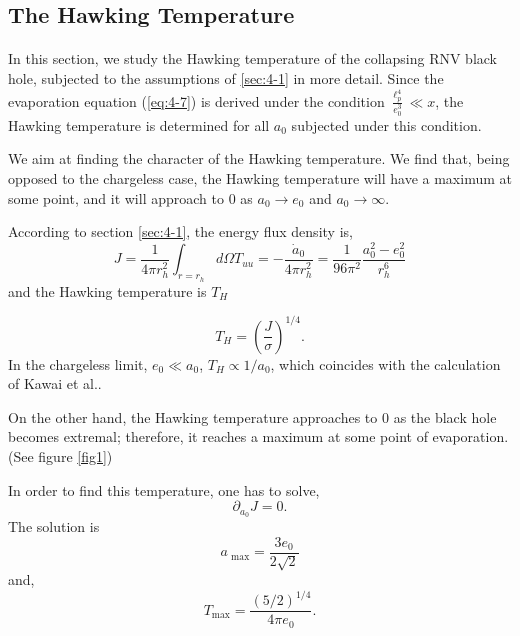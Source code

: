 \documentclass[letterpaper,12pt]{article}
\begin{document}
\subsection{The Hawking Temperature}\label{sec:4-3}
\paragraph{ }
In this section, we study the Hawking temperature of the collapsing RNV black hole, subjected to the assumptions of \ref{sec:4-1} in more detail. Since the evaporation equation (\ref{eq:4-7}) is derived under the condition  $\frac{\ell_{p}^{4}}{e_{0}^{3}} \ll x$, the Hawking temperature is determined for all $a_{0}$ subjected under this condition.

We aim at finding the character of the Hawking temperature. We find that, being opposed to the chargeless case, the Hawking temperature will have a maximum at some point, and it will approach to 0 as $a_{0} \rightarrow e_{0}$ and $a_{0}\rightarrow \infty$.

According to section \ref{sec:4-1}, the energy flux density is, 
\begin{equation}
J =  \frac{1}{4\pi r_{h}^{2}}\int_{r=r_{h}} d\Omega T_{uu} = -\frac{\dot{a}_{0}}{4\pi r_{h}^{2}} = \frac{1}{96\pi^{2}}\frac{a_{0}^{2}-e_{0}^{2}}{r_{h}^{6}} 
\end{equation}
and the Hawking temperature is $T_{H}$



\begin{equation}\label{eq:106}
T_{H} = \left(\frac{J}{\sigma}\right)^{1/4} .
\end{equation}
In the chargeless limit, $e_{0} \ll a_{0}$, $T_{H} \propto 1/a_{0} $, which coincides with the calculation of Kawai et al.\cite{kawai2013self}.

On the other hand, the Hawking temperature approaches to 0 as the black hole becomes extremal; therefore, it reaches a maximum at some point of evaporation. (See figure \ref{fig1})

In order to find this temperature, one has to solve,
\begin{equation}
\partial_{a_{0}}J =0.
\end{equation}
The solution is 
\begin{equation}
a_{\textrm{ max}} =\frac{3e_{0}}{2\sqrt{2}}
\end{equation}
and,
\begin{equation}
T_{\textrm{max}} = \frac{(5/2)^{1/4}}{4\pi e_{0}}.
\end{equation}
\end{document}
